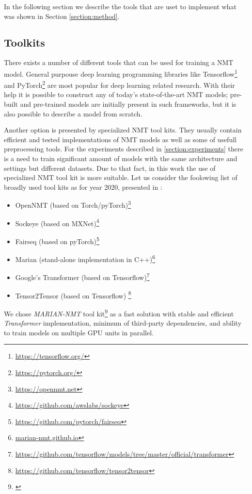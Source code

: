 In the following section we describe the tools that are uset to implement
what was shown in Section \ref{section:method}.

\subsection{Toolkits}

There exists a number of different tools that can be used for training a NMT model.
General purpouse deep learning programming libraries like
Tensorflow\footnote{\url{https://tensorflow.org/}} and
PyTorch\footnote{\url{https://pytorch.org/}} are most popular for deep learning related
research. With their help it is possible to construct any of today's state-of-the-art
NMT models; pre-built and pre-trained models are initially present in such frameworks,
but it is also possible to describe a model from scratch.

Another option is presented by specialized NMT tool kits.
They usually contain efficient and tested implementations of NMT models as well as some of
usefull preprocessing tools.
For the experiments described in \ref{section:experiments} there is a need to train significant
amount of models with the same architecture and settings but different datasets.
Due to that fact, in this work the use of specialized NMT tool kit is more suitable.
Let us consider the foolowing list of broadly used tool kits as for year 2020,
presented in \cite{koehn_2020}:

\begin{itemize}
  \item OpenNMT (based on Torch/pyTorch)\footnote{\url{https://opennmt.net}}
  \item Sockeye (based on MXNet)\footnote{\url{https://github.com/awslabs/sockeye}}
  \item Fairseq (based on pyTorch)\footnote{\url{https://github.com/pytorch/fairseq}}
  \item Marian (stand-alone implementation in C++)\footnote{\url{marian-nmt.github.io}}
  \item Google's Transformer (based on Tensorflow)\footnote{\url{
    https://github.com/tensorflow/models/tree/master/official/transformer}}
  \item Tensor2Tensor (based on Tensorflow) \footnote{\url{
    https://github.com/tensorflow/tensor2tensor}}
\end{itemize}

We chose \textit{MARIAN-NMT} tool kit\footnote{\cite{mariannmt}} as a fast solution
with stable and efficient \textit{Transformer} \cite{vaswani-2017-transformer} implementation,
minimum of third-party dependencies, and ability to train models on multiple GPU units in parallel.


